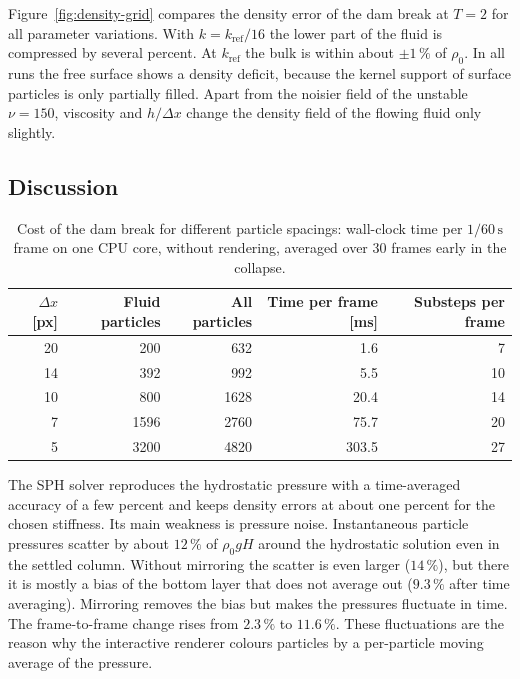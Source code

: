 Figure~\ref{fig:density-grid} compares the density error of the dam break at
$T = 2$ for all parameter variations. With $k = k_\mathrm{ref}/16$ the lower
part of the fluid is compressed by several percent. At $k_\mathrm{ref}$ the
bulk is within about $\pm1\,\%$ of $\rho_0$. In all runs the free surface shows
a density deficit, because the kernel support of surface particles is only
partially filled. Apart from the noisier field of the unstable $\nu = 150$,
viscosity and $h/\Delta x$ change the density field of the flowing fluid only
slightly.

\subsection{Discussion}

\begin{table}[tp]
    \centering
    \caption{Cost of the dam break for different particle spacings: wall-clock
    time per $1/60\,\mathrm{s}$ frame on one CPU core, without rendering,
    averaged over 30 frames early in the collapse.}
    \label{tab:performance}
    \begin{tabular}{rrrrr}
        \toprule
        $\Delta x$ [px] & Fluid particles & All particles & Time per frame [ms] & Substeps per frame \\
        \midrule
        20 & 200 & 632 & 1.6 & 7 \\
        14 & 392 & 992 & 5.5 & 10 \\
        10 & 800 & 1628 & 20.4 & 14 \\
        7 & 1596 & 2760 & 75.7 & 20 \\
        5 & 3200 & 4820 & 303.5 & 27 \\
        \bottomrule
    \end{tabular}
\end{table}

The SPH solver reproduces the hydrostatic
pressure with a time-averaged accuracy of a few percent and keeps density
errors at about one percent for the chosen stiffness. Its main weakness is
pressure noise. Instantaneous particle pressures scatter by about $12\,\%$ of
$\rho_0 g H$ around the hydrostatic solution even in the settled column. Without
mirroring the scatter is even larger ($14\,\%$), but there it is mostly a bias of
the bottom layer that does not average out ($9.3\,\%$ after time averaging).
Mirroring removes the bias but makes the pressures fluctuate in time. The
frame-to-frame change rises from $2.3\,\%$ to $11.6\,\%$. These fluctuations are
the reason why the interactive renderer colours particles by a per-particle
moving average of the pressure.

